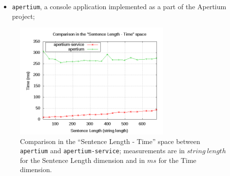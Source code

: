\documentclass[11pt]{article}
\begin{document}

\begin{itemize}
 \item {\tt apertium}, a console application implemented as a part of the Apertium project;
\end{itemize}

%
%
\begin{figure}[!ht]
\begin{center}
\includegraphics[width=7.75cm]{compap}
\end{center}
\caption{Comparison in the ``Sentence Length - Time'' space between {\tt apertium} and {\tt apertium-service}; measurements are in $string\ length$ for the Sentence Length dimension and in $ms$ for the Time dimension.}
\label{fig:compap}
\end{figure}
\end{document}
